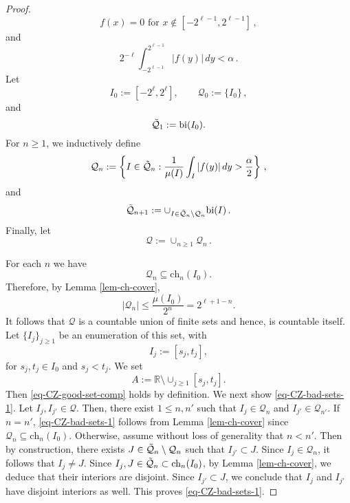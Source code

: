 {\begin{proof}
    \begin{equation}
        \label{eq-f-supp}
        f(x)=0 \textrm{ for } x\not\in [-2^{\ell-1}, 2^{\ell-1}]\,,
    \end{equation}
    and
    $$2^{-\ell}\int_{-2^{\ell-1}}^{2^{\ell-1}} |f(y)|\, dy< \alpha\,.$$
    Let $$I_0:=[-2^{\ell}, 2^{\ell}],\qquad \mathcal{Q}_0:=\{I_0\}\,,$$
    and
    $$\Tilde{\mathcal{Q}}_1:=\textrm{bi}(I_0).$$
    For $n\geq 1$, we inductively define
    \begin{equation*}
        {\mathcal{Q}}_n:=\left\{I\in \Tilde{\mathcal{Q}}_n: \frac{1}{\mu(I)}\int_{I} |f(y)|\, dy> \frac{\alpha}{2}\right\}\,,
    \end{equation*}
    and
    \begin{equation*}
     \Tilde{\mathcal{Q}}_{n+1}:=\cup_{I\in {\Tilde{\mathcal{Q}}}_n\setminus \mathcal{Q}_n} \textrm{bi} (I)\,.
    \end{equation*}
Finally, let
\begin{equation*}
    \mathcal{Q}:=\cup_{n\geq 1} \mathcal{Q}_n\,.
\end{equation*}

For each $n$ we have
$$\mathcal{Q}_n\subseteq \textrm{ch}_n(I_0).$$
Therefore, by Lemma \ref{lem-ch-cover},
$$|\mathcal{Q}_n|\leq \frac{\mu(I_0)}{2^n}= 2^{\ell+1-n}.$$
It follows that $\mathcal{Q}$ is a countable union of finite sets and hence, is countable itself. Let $\{I_j\}_{j\geq 1}$ be an enumeration of this set, with
$$I_j:=[s_j, t_j],$$
for $s_j, t_j\in I_0$ and $s_j<t_j$.
We set
\begin{equation*}
    A:=\mathbb{R}\setminus \cup_{j\geq 1} [s_j, t_j].
\end{equation*}
Then \eqref{eq-CZ-good-set-comp} holds by definition. We next show \eqref{eq-CZ-bad-sets-1}. Let $I_j, I_{j'}\in \mathcal{Q}$. Then, there exist $1\leq n, n'$ such that $I_j\in \mathcal{Q}_n$ and $I_{j'}\in \mathcal{Q}_{n'}$. If $n=n'$, \eqref{eq-CZ-bad-sets-1} follows from Lemma \ref{lem-ch-cover} since $\mathcal{Q}_n\subseteq \textrm{ch}_n(I_0).$ Otherwise, assume without loss of generality that $n<n'$. Then by construction, there exists $J\in \Tilde{\mathcal{Q}}_{n}\setminus {\mathcal{Q}_n}$ such that $I_{j'} \subset J$. Since $I_{j}\in \mathcal{Q}_n$, it follows that $I_j\neq J$. Since $I_j, J\in \Tilde{\mathcal{Q}}_{n}\subset \textrm{ch}_n(I_0)$, by Lemma \ref{lem-ch-cover}, we deduce that their interiors are disjoint. Since $I_{j'}\subset J$, we conclude that $I_j$ and
$I_{j'}$ have disjoint interiors as well. This proves \eqref{eq-CZ-bad-sets-1}.


\end{proof}}
